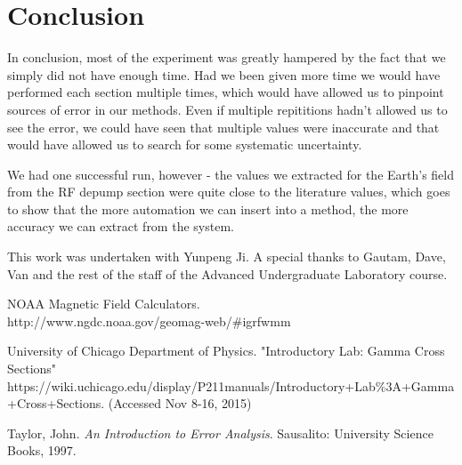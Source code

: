 \documentclass{article}
\begin{document}
\section{Conclusion}%
  In conclusion, most of the experiment was greatly hampered by the fact that we simply did not have enough time.  Had we been given more time we would have performed each section multiple times, which would have allowed us to pinpoint sources of error in our methods.  Even if multiple repititions hadn't allowed us to see the error, we could have seen that multiple values were inaccurate and that would have allowed us to search for some systematic uncertainty.

  \hspace{.25cm}

  We had one successful run, however - the values we extracted for the Earth's field from the RF depump section were quite close to the literature values, which goes to show that the more automation we can insert into a method, the more accuracy we can extract from the system.

  \hspace{.25cm}

  This work was undertaken with Yunpeng Ji.  A special thanks to Gautam, Dave, Van and the rest of the staff of the Advanced Undergraduate Laboratory course.
\begin{thebibliography}{10}
    NOAA Magnetic Field Calculators. \\ http://www.ngdc.noaa.gov/geomag-web/\#igrfwmm

  	University of Chicago Department of Physics. "Introductory Lab: Gamma Cross Sections"\\
  	https://wiki.uchicago.edu/display/P211manuals/Introductory+Lab\%3A+Gamma+Cross+Sections. (Accessed Nov 8-16, 2015)

  	Taylor, John. \emph{An Introduction to Error Analysis}. Sausalito: University Science Books, 1997.
\end{thebibliography}
\end{document}
